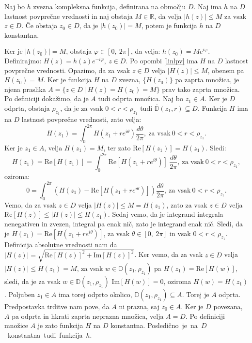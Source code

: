 \documentclass[mat1]{fmfdelo}
\begin{document}
    \begin{trditev}
        \label{pm_lpv}
        Naj bo $h$ zvezna kompleksna funkcija, definirana na območju $D$. Naj ima $h$ na $D$ lastnost povprečne vrednosti in naj obstaja $M \in \mathbb{R}$, da velja $|h(z)| \leq M$ za vsak $z \in D$. 
        Če obstaja $z_0 \in D$, da je $|h(z_0)| = M$, potem je funkcija $h$ na $D$ konstantna. 
    \end{trditev}
    \begin{dokaz}
        Ker je $|h(z_0)| = M$, obstaja $\varphi \in [0,~2\pi]$, da velja: \mbox{$h(z_0) = M e^{i \varphi}$}.
        Definirajmo: $H(z) = h(z) e^{-i\varphi},~z \in D$. Po opombi \ref{linlpv} ima $H$ na $D$ lastnost povprečne vrednosti. Opazimo, da za vsak $z \in D$ velja $|H(z)|  \leq M$, obenem pa \mbox{$H(z_0) = M$}.
        Ker je funkcija $H$ na $D$ zvezna, $\{H(z_0)\}$ pa zaprta množica, je njena praslika \mbox{$A = \{z \in D~|~H(z) = H(z_0) = M\}$} prav tako zaprta množica. Po definiciji dokažimo, da je $A$ tudi odprta množica. 
        Naj bo $z_1 \in A$. Ker je $D$ odprta, obstaja $\rho_{z_1}$, da je za vsak $0 < r < \rho_{z_1}$ tudi $\overline{\mathbb{D}}(z_1, r) \subseteq D$. 
        Funkcija $H$ ima na $D$ lastnost povprečne vrednosti, zato velja:
        $$
            H(z_1) = \int_{0}^{2\pi}{H(z_1 + re^{i\theta}) \frac{d\theta}{2\pi}},~\text{za vsak}~0<r<\rho_{z_1}.
        $$
        Ker je $z_1 \in A$, velja $H(z_1) = M$, ter zato $\text{Re}[H(z_1)] = H(z_1)$. 
        Sledi:
        $$
        H(z_1) = \text{Re}[H(z_1)] = \int_{0}^{2\pi}{\text{Re}[H(z_1 + re^{i\theta})]~\frac{d\theta}{2\pi}},~\text{za vsak}~0<r<\rho_{z_1},
        $$
        oziroma:
        $$
        0 = \int_{0}^{2\pi}{\left(H(z_1) - \text{Re}[H(z_1 + re^{i\theta})] \right)\frac{d\theta}{2\pi}},~\text{za vsak}~0<r<\rho_{z_1}.
        $$
        Vemo, da za vsak $z \in D$ velja $|H(z)| \leq M = H(z_1)$, zato za vsak $z \in D$ velja $\text{Re}[H(z)] \leq |H(z)| \leq H(z_1)$.
        Sedaj vemo, da je integrand integrala nenegativen in zvezen, integral pa enak nič, zato je integrand enak nič. 
        Sledi, da je \mbox{$H(z_1) = \text{Re}[H(z_1 + r e^{i \theta})]$}, za vsak $\theta \in [0,~2\pi]$ in vsak $0 < r < \rho_{z_1}$. Definicija absolutne vrednosti nam da $|H(z)| = \sqrt{\text{Re}[H(z)]^2 + \text{Im}[H(z)]^2}$. 
        Ker vemo, da za vsak $z \in D$ velja $|H(z)| \leq H(z_1) = M$, za vsak $w \in \mathbb{D}(z_1,\rho_{z_1})$ pa $H(z_1) = \text{Re}[H(w)]$, sledi, da je za vsak $w \in \mathbb{D}(z_1,\rho_{z_1})$ $\text{Im}[H(w)] = 0$, oziroma $H(w) = H(z_1)$. 
        Poljuben $z_1 \in A$ ima torej odprto okolico, $ \mathbb{D}(z_1, \rho_{z_1}) \subseteq A$. Torej je $A$ odprta.
        Predpostavka trditve nam pove, da $A$ ni prazna, saj $z_0 \in A$. Ker je $D$ povezana, $A$ pa odprta in hkrati zaprta neprazna množica, velja $A = D$. 
        Po definiciji množice $A$ je zato funkcija $H$ na $D$ konstantna. \mbox{Posledično je na $D$ konstantna tudi funkcija $h$.} 
    \end{dokaz}
\end{document}

